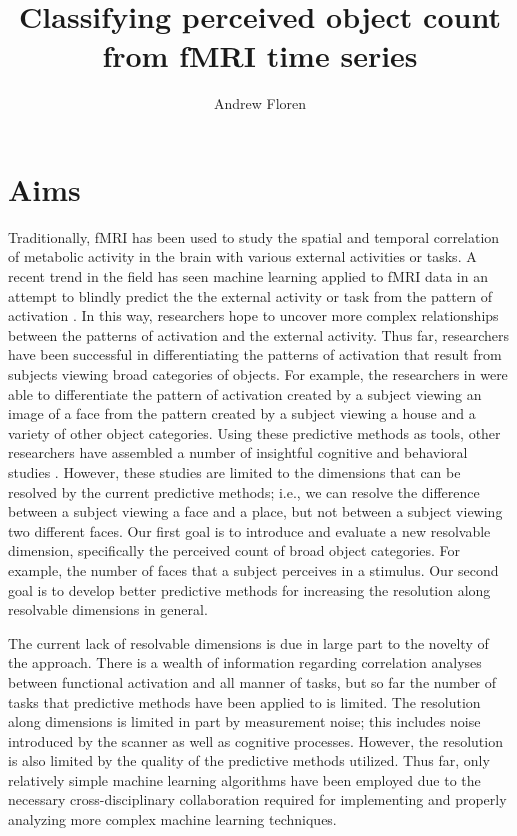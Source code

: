 \documentclass[12pt]{article}
\title{Classifying perceived object count from fMRI time series}
\author{Andrew Floren}
\date{}
\begin{document}
\maketitle{}

\section{Aims}
Traditionally, fMRI has been used to study the spatial and temporal correlation of metabolic activity in the brain with various external activities or tasks.
A recent trend in the field has seen machine learning applied to fMRI data in an attempt to blindly predict the the external activity or task from the pattern of activation \cite{Haxby2001,Mitchell2003,Haynes2006}.
In this way, researchers hope to uncover more complex relationships between the patterns of activation and the external activity.
Thus far, researchers have been successful in differentiating the patterns of activation that result from subjects viewing broad categories of objects.
For example, the researchers in \cite{Haxby2001} were able to differentiate the pattern of activation created by a subject viewing an image of a face from the pattern created by a subject viewing a house and a variety of other object categories.
Using these predictive methods as tools, other researchers have assembled a number of insightful cognitive and behavioral studies \cite{Lewis-Peacock2012,Davatzikos2005}.
However, these studies are limited to the dimensions that can be resolved by the current predictive methods; i.e., we can resolve the difference between a subject viewing a face and a place, but not between a subject viewing two different faces.
Our first goal is to introduce and evaluate a new resolvable dimension, specifically the perceived count of broad object categories.
For example, the number of faces that a subject perceives in a stimulus.
Our second goal is to develop better predictive methods for increasing the resolution along resolvable dimensions in general.

The current lack of resolvable dimensions is due in large part to the novelty of the approach.
There is a wealth of information regarding correlation analyses between functional activation and all manner of tasks, but so far the number of tasks that predictive methods have been applied to is limited.
The resolution along dimensions is limited in part by measurement noise; this includes noise introduced by the scanner as well as cognitive processes.
However, the resolution is also limited by the quality of the predictive methods utilized.
Thus far, only relatively simple machine learning algorithms have been employed due to the necessary cross-disciplinary collaboration required for implementing and properly analyzing more complex machine learning techniques.
\end{document}
